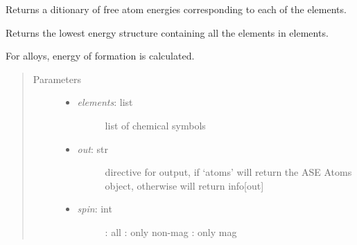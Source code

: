 \documentclass[letterpaper,10pt,english]{sphinxmanual}
\begin{document}
\begin{fulllineitems}
\begin{fulllineitems}
\label{classes:catdata.CATData.get_free_atom_energies}
Returns a ditionary of free atom energies corresponding to each of 
the elements.

\end{fulllineitems}


\begin{fulllineitems}
\label{classes:catdata.CATData.get_ground_state}
Returns the lowest energy structure containing all the elements
in elements.

For alloys, energy of formation is calculated.
\begin{quote}\begin{description}
\item[{Parameters}] \leavevmode\begin{itemize}
\item {} \begin{description}
\item[{\emph{elements}: list}] \leavevmode
list of chemical symbols

\end{description}

\item {} \begin{description}
\item[{\emph{out}: str}] \leavevmode
directive for output, if `atoms' will return the ASE Atoms
object, otherwise will return info{[}out{]}

\end{description}

\item {} \begin{description}
\item[{\emph{spin}: int}] \leavevmode
{} : all    : only non-mag   : only mag

\end{description}

\end{itemize}

\end{description}\end{quote}

\end{fulllineitems}


\end{fulllineitems}
\end{document}
